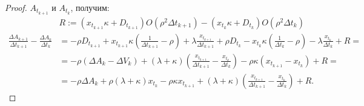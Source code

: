 \begin{appendices}
\begin{proof}
        $A_{t_{k+1}}$ и $A_{t_{k}}$, получим:
        \begin{align*}
                & R := (x_{t_{k+1}} \kappa + D_{t_{k+1}}) O(\rho^2 \Delta t_{k+1}) - (x_{t_k} \kappa + D_{t_k}) O(\rho^2 \Delta t_k) \\
                \frac{\Delta A_{k+1}}{\Delta t_{k+1}} - \frac{\Delta A_{k}}{\Delta t_{k}} &=
                - \rho D_{t_{k+1}} + x_{t_{k+1}} \kappa \left(\frac{1}{\Delta t_{k+1}} - \rho \right) + \lambda \frac{x_{t_{k+1}}}{\Delta t_{k+1}}
                + \rho D_{t_{k}}   - x_{t_{k}}   \kappa \left(\frac{1}{\Delta t_{k}} - \rho \right)   - \lambda \frac{x_{t_k}}    {\Delta t_{k}} 
                + R = \\
                &= -\rho (\Delta A_k - \Delta V_k) + (\lambda + \kappa) \left(\frac{x_{t_{k+1}}}{\Delta t_{k+1}} - \frac{x_{t_k}}{\Delta t_{k}}\right) 
                - \rho \kappa (x_{t_{k+1}} - x_{t_{k}}) + R = \\
                &= -\rho \Delta A_k + \rho (\lambda + \kappa) x_{t_k} - \rho \kappa x_{t_{k+1}} 
                + (\lambda + \kappa) \left(\frac{x_{t_{k+1}}}{\Delta t_{k+1}} - \frac{x_{t_k}}{\Delta t_{k}}\right) + R.
        \end{align*} 


\end{proof}
\end{appendices}
